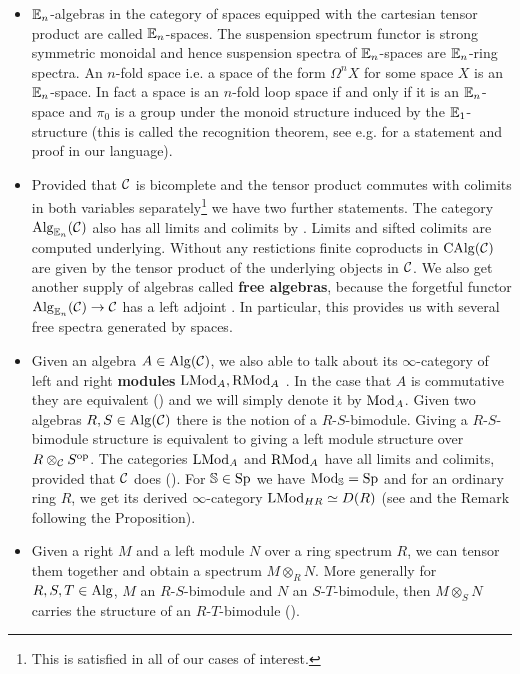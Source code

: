 \begin{itemize}
    \item $\mathbb{E}_n$-algebras in the category of spaces equipped with the cartesian tensor product are called $\mathbb{E}_n$-spaces. The suspension spectrum functor is strong symmetric monoidal and hence suspension spectra of $\mathbb{E}_n$-spaces are $\mathbb{E}_n$-ring spectra. An $n$-fold space i.e. a space of the form $\Omega^n X$ for some space $X$ is an $\mathbb{E}_n$-space. In fact a space is an $n$-fold loop space if and only if it is an $\mathbb{E}_n$-space and $\pi_0$ is a group under the monoid structure induced by the $\mathbb{E}_1$-structure (this is called the recognition theorem, see e.g. \cite[Section~5.2.6]{lurie2017higher} for a statement and proof in our language).
    \item Provided that $\mathcal{C}$ is bicomplete and the tensor product commutes with colimits in both variables separately\footnote{This is satisfied in all of our cases of interest.} we have two further statements. The category $\operatorname{Alg}_{\mathbb{E}_n}(\mathcal{C})$ also has all limits and colimits by \cite[Section~3.2]{lurie2017higher}. Limits and sifted colimits are computed underlying. Without any restictions finite coproducts in $\operatorname{CAlg}(\mathcal{C})$ are given by the tensor product of the underlying objects in $\mathcal{C}$. 
    We also get another supply of algebras called \textbf{free algebras}, because the forgetful functor $\operatorname{Alg}_{\mathbb{E}_n}(\mathcal{C})\to \mathcal{C}$ has a left adjoint \cite[Corollary~3.1.3.5]{lurie2017higher}. In particular, this provides us with several free spectra generated by spaces. 
    \item Given an algebra $A\in \operatorname{Alg}(\mathcal{C})$, we also able to talk about its $\infty$-category of left and right \textbf{modules }$\operatorname{LMod}_A, \operatorname{RMod}_A$ \cite[Definition~4.2.1.13]{lurie2017higher}. In the case that $A$ is commutative they are equivalent (\cite[Section~4.3.2]{lurie2017higher}) and we will simply denote it by $\operatorname{Mod}_A$. Given two algebras $R,S\in \operatorname{Alg}(\mathcal{C})$ there is the notion of a $R$-$S$-bimodule. Giving a $R$-$S$-bimodule structure is equivalent to giving a left module structure over $R\otimes_{\mathcal{C}} S^{\operatorname{op}}$. The categories $\operatorname{LMod}_A$ and $\operatorname{RMod}_A$ have all limits and colimits, provided that $\mathcal{C}$ does (\cite[Section~4.2.3]{lurie2017higher}). For $\mathbb{S}\in\operatorname{Sp}$ we have $\operatorname{Mod}_{\mathbb{S}}=\operatorname{Sp}$ and for an ordinary ring $R$, we get its derived $\infty$-category $\operatorname{LMod}_{HR}\simeq D(R)$ (see \cite[Proposition~7.1.1.15]{lurie2017higher} and the Remark following the Proposition).
    \item Given a right $M$ and a left module $N$ over a ring spectrum $R$, we can tensor them together and obtain a spectrum $M\otimes_R N$. More generally for $R,S,T\in \operatorname{Alg}$, $M$ an $R$-$S$-bimodule and $N$ an $S$-$T$-bimodule, then $M\otimes_S N$ carries the structure of an $R$-$T$-bimodule (\cite[Section~4.4.2]{lurie2017higher}). 

\end{itemize}
